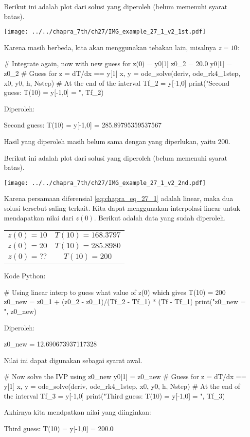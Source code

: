 Berikut ini adalah plot dari solusi yang diperoleh (belum memenuhi syarat batas).

{\centering
\texttt{[image: ../../chapra\_7th/ch27/IMG\_example\_27\_1\_v2\_1st.pdf]}
\par}

Karena masih berbeda, kita akan menggunakan tebakan lain, misalnya $z=10$:
\begin{pythoncode}
# Integrate again, now with new guess for z(0) = y0[1]
z0_2 = 20.0
y0[1] = z0_2 # Guess for z = dT/dx == y[1]
x, y = ode_solve(deriv, ode_rk4_1step, x0, y0, h, Nstep)
# At the end of the interval
Tf_2 = y[-1,0]
print("Second guess: T(10) = y[-1,0] = ", Tf_2)
\end{pythoncode}
Diperoleh:
\begin{textcode}
Second guess: T(10) = y[-1,0] =  285.89795359537567
\end{textcode}
Hasil yang diperoleh masih belum sama dengan yang diperlukan, yaitu 200.

Berikut ini adalah plot dari solusi yang diperoleh (belum memenuhi syarat batas).

{\centering
\texttt{[image: ../../chapra\_7th/ch27/IMG\_example\_27\_1\_v2\_2nd.pdf]}
\par}

Karena persamaan diferensial \eqref{eq:chapra_eq_27_1} adalah linear, maka
dua solusi tersebut saling terkait.
Kita dapat menggunakan interpolasi linear untuk mendapatkan nilai dari $z(0)$.
Berikut adalah data yang sudah diperoleh.

{\centering
\begin{tabular}{|c|c|}
\hline
$z(0) = 10$ & $T(10) = 168.3797$ \\
$z(0) = 20$ & $T(10) = 285.8980$ \\
$z(0) = ??$ & $T(10) = 200$ \\
\hline
\end{tabular}
\par}

Kode Python:
\begin{pythoncode}
# Using linear interp to guess what value of z(0) which gives T(10) = 200
z0_new = z0_1 + (z0_2 - z0_1)/(Tf_2 - Tf_1) * (Tf - Tf_1)
print("z0_new = ", z0_new)
\end{pythoncode}
Diperoleh:
\begin{textcode}
z0_new =  12.690673937117328
\end{textcode}

Nilai ini dapat digunakan sebagai syarat awal.
\begin{pythoncode}
# Now solve the IVP using z0_new
y0[1] = z0_new # Guess for z = dT/dx == y[1]
x, y = ode_solve(deriv, ode_rk4_1step, x0, y0, h, Nstep)
# At the end of the interval
Tf_3 = y[-1,0]
print("Third guess: T(10) = y[-1,0] = ", Tf_3)
\end{pythoncode}
Akhirnya kita mendpatkan nilai yang diinginkan:
\begin{textcode}
Third guess: T(10) = y[-1,0] =  200.0
\end{textcode}

